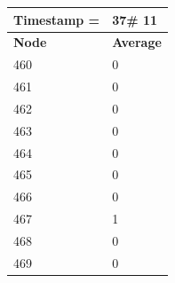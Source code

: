 \begin{tabular}{|l||l|}
\hline
\textbf{Timestamp =} & \textbf{37}\# 11\\\hline
	\textbf{Node} & \textbf{Average} \\ \hline
\hline
	460 & 0 \\ \hline
	461 & 0 \\ \hline
	462 & 0 \\ \hline
	463 & 0 \\ \hline
	464 & 0 \\ \hline
	465 & 0 \\ \hline
	466 & 0 \\ \hline
	467 & 1 \\ \hline
	468 & 0 \\ \hline
	469 & 0 \\ \hline
\end{tabular}

